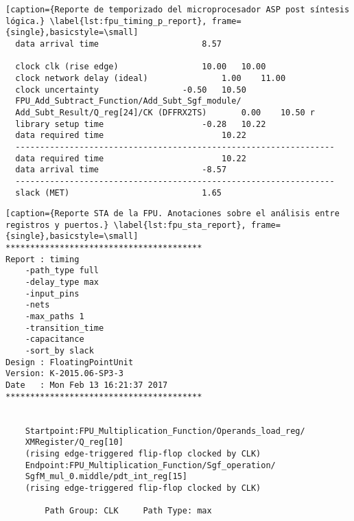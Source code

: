\begin{lstlisting}[caption={Reporte de temporizado del microprocesador ASP post síntesis lógica.} \label{lst:fpu_timing_p_report}, frame={single},basicstyle=\small]
  data arrival time						8.57

  clock clk (rise edge)					10.00	10.00
  clock network delay (ideal)				1.00	11.00
  clock uncertainty					-0.50	10.50
  FPU_Add_Subtract_Function/Add_Subt_Sgf_module/
  Add_Subt_Result/Q_reg[24]/CK (DFFRX2TS)		0.00	10.50 r
  library setup time					-0.28	10.22
  data required time						10.22
  -----------------------------------------------------------------
  data required time						10.22
  data arrival time						-8.57
  -----------------------------------------------------------------
  slack (MET)							1.65
\end{lstlisting}


\begin{lstlisting}[caption={Reporte STA de la FPU. Anotaciones sobre el análisis entre registros y puertos.} \label{lst:fpu_sta_report}, frame={single},basicstyle=\small]
****************************************
Report : timing
	-path_type full
	-delay_type max
	-input_pins
	-nets
	-max_paths 1
	-transition_time
	-capacitance
	-sort_by slack
Design : FloatingPointUnit
Version: K-2015.06-SP3-3
Date   : Mon Feb 13 16:21:37 2017
****************************************


	Startpoint:FPU_Multiplication_Function/Operands_load_reg/
	XMRegister/Q_reg[10]
	(rising edge-triggered flip-flop clocked by CLK)
	Endpoint:FPU_Multiplication_Function/Sgf_operation/
	SgfM_mul_0.middle/pdt_int_reg[15]
	(rising edge-triggered flip-flop clocked by CLK)
		
        Path Group: CLK 	Path Type: max


\end{lstlisting}
